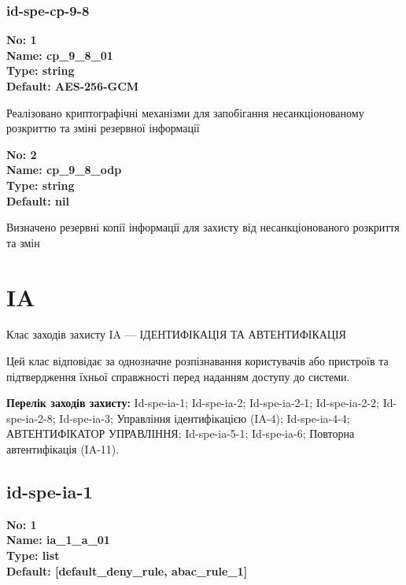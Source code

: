\documentclass{article}
\begin{document}
\subsubsection{id-spe-cp-9-8}


\vspace{10pt}
{\footnotesize\bfseries
No: 1\\
Name: cp\_\allowbreak{}9\_\allowbreak{}8\_\allowbreak{}01\\
Type: string\\
Default: \textquotedbl{}AES-256-GCM\textquotedbl{}
}

{\footnotesize Реалізовано криптографічні механізми для запобігання несанкціонованому розкриттю та зміні резервної інформації}


{\footnotesize\bfseries
No: 2\\
Name: cp\_\allowbreak{}9\_\allowbreak{}8\_\allowbreak{}odp\\
Type: string\\
Default: nil
}

{\footnotesize Визначено резервні копії інформації для захисту від несанкціонованого розкриття та змін}




\section{IA}
Клас заходів захисту IA --- ІДЕНТИФІКАЦІЯ ТА АВТЕНТИФІКАЦІЯ

Цей клас відповідає за однозначне розпізнавання користувачів або пристроїв та підтвердження їхньої справжності перед наданням доступу до системи.

\textbf{Перелік заходів захисту:} Id-spe-ia-1; Id-spe-ia-2; Id-spe-ia-2-1; Id-spe-ia-2-2; Id-spe-ia-2-8; Id-spe-ia-3; Управління ідентифікацією (IA-4); Id-spe-ia-4-4; АВТЕНТИФІКАТОР УПРАВЛІННЯ; Id-spe-ia-5-1; Id-spe-ia-6; Повторна автентифікація (IA-11).

\subsection{id-spe-ia-1}


\vspace{10pt}
{\footnotesize\bfseries
No: 1\\
Name: ia\_\allowbreak{}1\_\allowbreak{}a\_\allowbreak{}01\\
Type: list\\
Default: [\textquotedbl{}default\_\allowbreak{}deny\_\allowbreak{}rule\textquotedbl{}, \textquotedbl{}abac\_\allowbreak{}rule\_\allowbreak{}1\textquotedbl{}]
}
\end{document}
